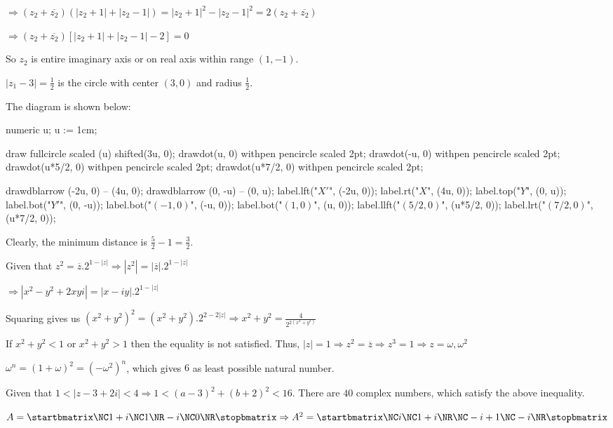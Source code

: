   $\Rightarrow (z_2 + \overline{z_2})(|z_2 + 1| + |z_2 - 1|) = |z_2 + 1|^2 - |z_2 - 1|^2 = 2(z_2 +
  \overline{z_2})$

  $\Rightarrow (z_2 + \overline{z_2})[|z_2 + 1| + |z_2 - 1| - 2] = 0$

  So $z_2$ is entire imaginary axis or on real axis within range $(1, -1)$.

  $|z_1 - 3| = \frac{1}{2}$ is the circle with center $(3, 0)$ and radius $\frac{1}{2}$.

  The diagram is shown below:

  \startplacefigure[location=force]
    \startMPcode
      numeric u;
      u := 1cm;

      draw fullcircle scaled (u) shifted(3u, 0);
      drawdot(u, 0) withpen pencircle scaled 2pt;
      drawdot(-u, 0) withpen pencircle scaled 2pt;
      drawdot(u*5/2, 0) withpen pencircle scaled 2pt;
      drawdot(u*7/2, 0) withpen pencircle scaled 2pt;


      drawdblarrow (-2u, 0) -- (4u, 0);
      drawdblarrow (0, -u) -- (0, u);
      label.lft("$X'$", (-2u, 0));
      label.rt("$X$", (4u, 0));
      label.top("$Y$", (0, u));
      label.bot("$Y'$", (0, -u));
      label.bot("$(-1, 0)$", (-u, 0));
      label.bot("$(1, 0)$", (u, 0));
      label.llft("$(5/2, 0)$", (u*5/2, 0));
      label.lrt("$(7/2, 0)$", (u*7/2, 0));
    \stopMPcode
  \stopplacefigure

  Clearly, the minimum distance is $\frac{5}{2} - 1 = \frac{3}{2}$.
\item Given that $z^2 = \overline{z}.2^{1 - |z|} \Rightarrow |z^2| = |\overline{z}|.2^{1 - |z|}$

  $\Rightarrow |x^2 - y^2 + 2xyi| = |x - iy|.2^{1 - |z|}$

  Squaring gives us $(x^2 + y^2)^2 = (x^2 + y^2).2^{2 - 2|z|}\Rightarrow x^2 + y^2 = \frac{4}{2^{2(x^2 +
      y^2)}}$

  If $x^2 + y^2 < 1$ or $x^2 + y^2 > 1$ then the equality is not satisfied. Thus, $|z| = 1\Rightarrow z^2
  = \overline{z}\Rightarrow z^3 = 1\Rightarrow z = \omega, \omega^2$

  $\omega^n = (1 + \omega)^2 = (-\omega^2)^n$, which gives $6$ as least possible natural number.
\item Given that $1 < |z - 3 + 2i| < 4 \Rightarrow 1 < (a - 3)^2 + (b + 2)^2 < 16$. There are $40$
  complex numbers, which satisfy the above inequality.
\item $A = \startbmatrix\NC1 + i\NC 1\NR -i\NC 0\NR\stopbmatrix\Rightarrow A^2 = \startbmatrix\NC i\NC  1 +
  i\NR\NC -i + 1\NC -i\NR\stopbmatrix$

